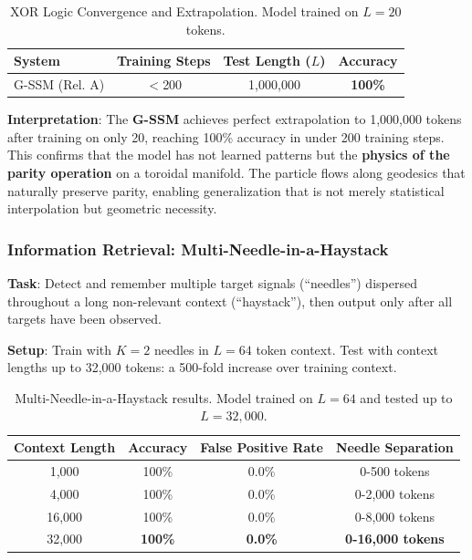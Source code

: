 \documentclass[12pt,a4paper]{article}
\begin{document}
\begin{table}[htbp]
    \centering
    \caption{XOR Logic Convergence and Extrapolation. Model trained on $L=20$ tokens.}
    \label{tab:xor-results}
    \begin{tabular}{lccc}
        \toprule
        \textbf{System} & \textbf{Training Steps} & \textbf{Test Length ($L$)} & \textbf{Accuracy} \\
        \midrule
        G-SSM (Rel. A) & $<$200 & 1,000,000 & \textbf{100\%} \\
        \bottomrule
    \end{tabular}
\end{table}

\noindent\textbf{Interpretation}: The \textbf{G-SSM} achieves perfect extrapolation to 1,000,000 tokens after training on only 20, reaching 100\% accuracy in under 200 training steps. This confirms that the model has not learned patterns but the \textbf{physics of the parity operation} on a toroidal manifold. The particle flows along geodesics that naturally preserve parity, enabling generalization that is not merely statistical interpolation but geometric necessity.

\subsubsection{Information Retrieval: Multi-Needle-in-a-Haystack}
\label{sec:mniah-experiment}

\textbf{Task}: Detect and remember multiple target signals (``needles'') dispersed throughout a long non-relevant context (``haystack''), then output only after all targets have been observed.

\textbf{Setup}: Train with $K = 2$ needles in $L = 64$ token context. Test with context lengths up to 32,000 tokens: a 500-fold increase over training context.

\begin{table}[htbp]
    \centering
    \caption{Multi-Needle-in-a-Haystack results. Model trained on $L=64$ and tested up to $L=32,000$.}
    \label{tab:mniah-results}
    \begin{tabular}{cccc}
        \toprule
        \textbf{Context Length} & \textbf{Accuracy} & \textbf{False Positive Rate} & \textbf{Needle Separation} \\
        \midrule
        1,000 & 100\% & 0.0\% & 0-500 tokens \\
        4,000 & 100\% & 0.0\% & 0-2,000 tokens \\
        16,000 & 100\% & 0.0\% & 0-8,000 tokens \\
        32,000 & \textbf{100\%} & \textbf{0.0\%} & \textbf{0-16,000 tokens} \\
        \bottomrule
    \end{tabular}
\end{table}
\end{document}
